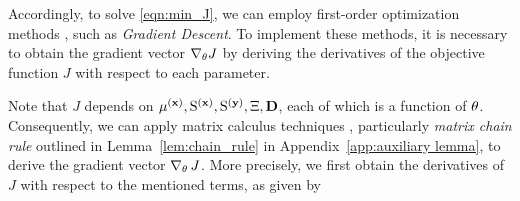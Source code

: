 Accordingly, to solve \eqref{eqn:min_J}, we can employ first-order optimization methods \cite{nocedal1999numerical}, such as \emph{Gradient Descent}.  
To implement these methods, it is necessary to obtain the gradient vector $\nabla_{ \mathrm{\theta} } J$ by deriving the derivatives of the objective function $J$ with respect to each parameter.

Note that $J$ depends on $\mu^{(\mathbf{x})}, { \mathrm{S} }^{(\mathbf{x})}, { \mathrm{S} }^{(\mathbf{y})}, \Xi, \mathbf{D}$, each of which is a function of ${ \mathrm{\theta} }$. Consequently, we can apply matrix calculus techniques \cite{petersen2008matrix}, particularly \emph{matrix chain rule} outlined in Lemma~\ref{lem:chain_rule} in Appendix~\ref{app:auxiliary lemma}, to derive the gradient vector $\nabla_{ \mathrm{\theta} } \, J$. More precisely, we first obtain the derivatives of $J$ with respect to the mentioned terms, as given by
